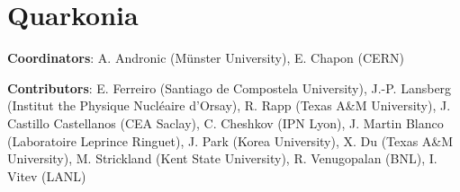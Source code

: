 \documentclass[../report.tex]{subfiles}
\begin{document}
\section{Quarkonia}

\label{sec:quarkonia}

{ \small
\noindent \textbf{Coordinators}: A. Andronic (M\"{u}nster University), E. Chapon (CERN)

\noindent \textbf{Contributors}: 
E. Ferreiro (Santiago de Compostela University), J.-P. Lansberg (Institut the Physique Nucl\'{e}aire d'Orsay), R. Rapp (Texas A\&M University),
J. Castillo Castellanos (CEA Saclay),
C. Cheshkov (IPN Lyon),
J. Martin Blanco (Laboratoire Leprince Ringuet),
J. Park (Korea University), 
X. Du (Texas A\&M University),
M. Strickland (Kent State University), R. Venugopalan (BNL), I. Vitev (LANL)
}

\end{document}
